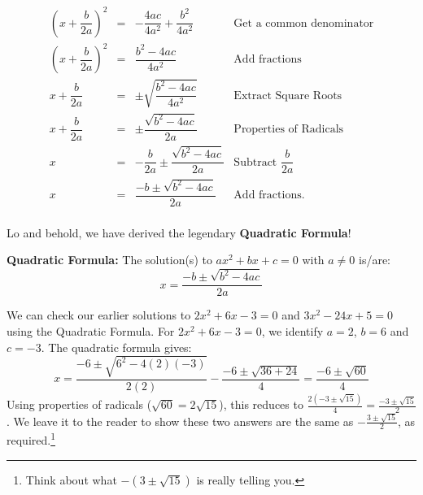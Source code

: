\documentclass{ximera}
\begin{document}
{{{\[\begin{array}{rclr}
\left(x + \dfrac{b}{2a}\right)^2 & = & -\dfrac{4ac}{4a^2} + \dfrac{b^2}{4a^2} & \text{Get a common denominator}\\

\left(x + \dfrac{b}{2a}\right)^2 & = & \dfrac{b^2 - 4ac}{4a^2} & \text{Add fractions}\\ [5pt]

x + \dfrac{b}{2a} & = & \pm \sqrt{\dfrac{b^2 - 4ac}{4a^2}} & \text{Extract Square Roots} \\ [8pt]

x + \dfrac{b}{2a} & = & \pm \dfrac{\sqrt{b^2 - 4ac}}{2a} & \text{Properties of Radicals} \\ [8pt]

x  & = & - \dfrac{b}{2a} \pm \dfrac{\sqrt{b^2 - 4ac}}{2a} & \text{Subtract $\dfrac{b}{2a}$} \\ [8pt]

x  & = & \dfrac{-b \pm \sqrt{b^2 - 4ac}}{2a} & \text{Add fractions.} \\

\end{array}\]

Lo and behold, we have derived the legendary \textbf{Quadratic Formula}!

\medskip

\colorbox{ResultColor}{\bbm

\begin{theorem}\label{quadraticformula}  \textbf{Quadratic Formula:} The solution(s) to $ax^2 + bx + c = 0$ with $a \neq 0$ is/are: \[x  = \dfrac{-b \pm \sqrt{b^2 - 4ac}}{2a} \]

\end{theorem}


\medskip

We can check our earlier solutions to $2x^2 + 6x - 3 = 0$ and $3x^2 - 24x + 5 = 0$ using the Quadratic Formula.  For $2x^2 + 6x - 3 = 0$, we identify $a = 2$, $b = 6$ and $c = -3$.  The quadratic formula gives: \[ x = \dfrac{-6 \pm \sqrt{6^2 - 4(2)(-3)}}{2(2)} - \dfrac{-6 \pm \sqrt{36 + 24}}{4} = \dfrac{-6 \pm \sqrt{60}}{4} \] Using properties of radicals ($\sqrt{60} = 2 \sqrt{15}$), this reduces to $\frac{2(-3 \pm \sqrt{15})}{4} =\frac{-3 \pm \sqrt{15}}{2}$. We leave it to the reader to show these two answers are the same as $-\frac{3 \pm \sqrt{15}}{2}$,  as required.\footnote{Think about what $-(3 \pm \sqrt{15})$ is really telling you.}  

\smallskip

}}}}
\end{document}
